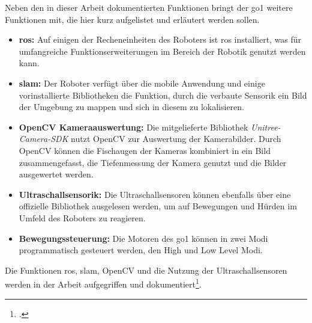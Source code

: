 Neben den in dieser Arbeit dokumentierten Funktionen bringt der \gls{go1} weitere Funktionen mit, die hier kurz
aufgelistet und erläutert werden sollen.

\begin{itemize}
    \item \textbf{\gls{ros}:}
    Auf einigen der Recheneinheiten des Roboters ist \gls{ros} installiert, was für umfangreiche Funktionserweiterungen
    im Bereich der Robotik genutzt werden kann.
    \item \textbf{\gls{slam}:}
    Der Roboter verfügt über die mobile Anwendung und einige vorinstallierte Bibliotheken die Funktion, durch die verbaute
    Sensorik ein Bild der Umgebung zu mappen und sich in diesem zu lokalisieren.
    \item \textbf{OpenCV Kameraauswertung:}
    Die mitgelieferte Bibliothek \emph{Unitree-Camera-SDK} nutzt OpenCV zur Auswertung der Kamerabilder.
    Durch OpenCV können die Fischaugen der Kameras kombiniert in ein Bild zusammengefasst, die Tiefenmessung der Kamera
    genutzt und die Bilder ausgewertet werden.
    \item \textbf{Ultraschallsensorik:}
    Die Ultraschallsensoren können ebenfalls über eine offizielle Bibliothek ausgelesen werden, um auf Bewegungen und Hürden
    im Umfeld des Roboters zu reagieren.
    \item \textbf{Bewegungssteuerung:}
    Die Motoren des \gls{go1} können in zwei Modi programmatisch gesteuert werden, den High und Low Level Modi.
\end{itemize}

\noindent Die Funktionen \gls{ros}, \gls{slam}, OpenCV und die Nutzung der Ultraschallsensoren werden in der Arbeit
 aufgegriffen und dokumentiert\footcite{jonas}.